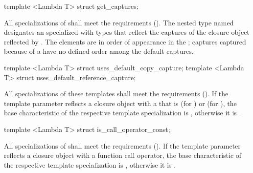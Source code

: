\begin{std.txt}\color{addclr}
\begin{itemdecl}
template <Lambda T> struct get_captures;
\end{itemdecl}
\begin{itemdescr}
\pnum
      All specializations of  shall meet the
       requirements (). The nested type
      named  designates an  specialized
      with  types that reflect the captures of the closure
      object reflected by .  The elements are in order of appearance
      in the ; captures captured because of a
       have no defined order among the default
      captures.
\end{itemdescr}

\begin{itemdecl}
template <Lambda T> struct uses_default_copy_capture;
template <Lambda T> struct uses_default_reference_capture;
\end{itemdecl}
\begin{itemdescr}
\pnum
      All specializations of these templates shall meet the
       requirements (). If the template
      parameter reflects a closure object with a 
      that is \tcode{=} (for ) or \tcode{\&}
      (for ), the base characteristic of
      the respective template specialization is , otherwise it
      is .
\end{itemdescr}

\begin{itemdecl}
template <Lambda T> struct is_call_operator_const;
\end{itemdecl}
\begin{itemdescr}
\pnum
      All specializations of  shall meet the
       requirements (). If the template
      parameter reflects a closure object with a  function call
      operator, the base characteristic of the respective template
      specialization is , otherwise it is .
\end{itemdescr}
\end{std.txt}


